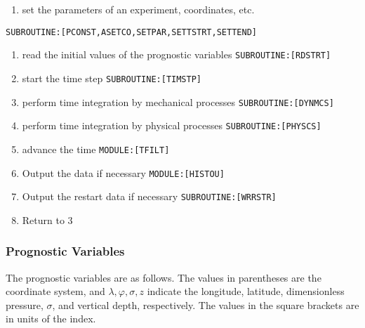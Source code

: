 \begin{enumerate}
\def\labelenumi{\arabic{enumi}.}
\tightlist
\item
  set the parameters of an experiment, coordinates, etc.
\end{enumerate}

\texttt{SUBROUTINE:{[}PCONST,ASETCO,SETPAR,SETTSTRT,SETTEND{]}}

\begin{enumerate}
\def\labelenumi{\arabic{enumi}.}
\setcounter{enumi}{1}
\item
  read the initial values of the prognostic variables
  \texttt{SUBROUTINE:{[}RDSTRT{]}}
\item
  start the time step \texttt{SUBROUTINE:{[}TIMSTP{]}}
\item
  perform time integration by mechanical processes
  \texttt{SUBROUTINE:{[}DYNMCS{]}}
\item
  perform time integration by physical processes
  \texttt{SUBROUTINE:{[}PHYSCS{]}}
\item
  advance the time \texttt{MODULE:{[}TFILT{]}}
\item
  Output the data if necessary \texttt{MODULE:{[}HISTOU{]}}
\item
  Output the restart data if necessary \texttt{SUBROUTINE:{[}WRRSTR{]}}
\item
  Return to 3
\end{enumerate}

\hypertarget{prognostic-variables}{%
\subsubsection{Prognostic Variables}\label{prognostic-variables}}

The prognostic variables are as follows. The values in parentheses are
the coordinate system, and \(\lambda,\varphi,\sigma, z\) indicate the
longitude, latitude, dimensionless pressure, \(\sigma\), and vertical
depth, respectively. The values in the square brackets are in units of
the index.

